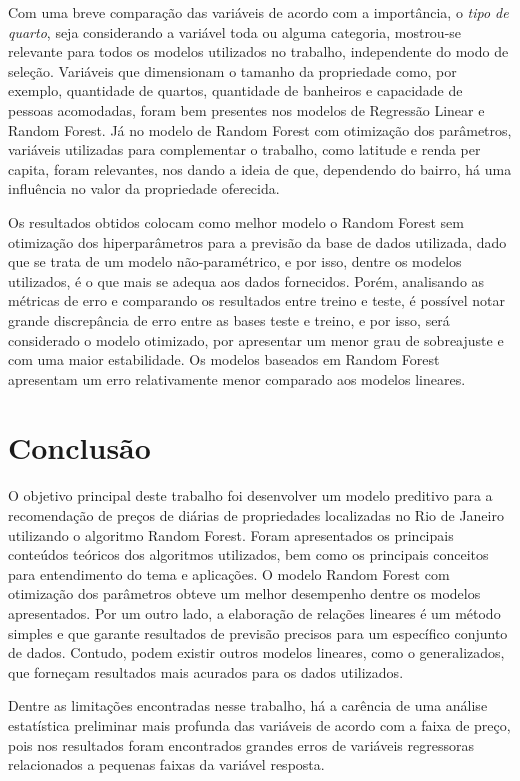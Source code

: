 \documentclass[
	12pt,				%
	a4paper,		%
	oneside,    %
	chapter=TITLE,		   %
	section=TITLE,		   %
	subsection=TITLE,	   %
	subsubsection=TITLE, %
	english,			%
	french,				%
	spanish,			%
	brazil,				%
]{abntex2}
\begin{document}
Com uma breve comparação das variáveis de acordo com a importância, o
\emph{tipo de quarto}, seja considerando a variável toda ou alguma
categoria, mostrou-se relevante para todos os modelos utilizados no
trabalho, independente do modo de seleção. Variáveis que dimensionam o
tamanho da propriedade como, por exemplo, quantidade de quartos,
quantidade de banheiros e capacidade de pessoas acomodadas, foram bem
presentes nos modelos de Regressão Linear e Random Forest. Já no modelo
de Random Forest com otimização dos parâmetros, variáveis utilizadas
para complementar o trabalho, como latitude e renda per capita, foram
relevantes, nos dando a ideia de que, dependendo do bairro, há uma
influência no valor da propriedade oferecida.

Os resultados obtidos colocam como melhor modelo o Random Forest sem
otimização dos hiperparâmetros para a previsão da base de dados
utilizada, dado que se trata de um modelo não-paramétrico, e por isso,
dentre os modelos utilizados, é o que mais se adequa aos dados
fornecidos. Porém, analisando as métricas de erro e comparando os
resultados entre treino e teste, é possível notar grande discrepância de
erro entre as bases teste e treino, e por isso, será considerado o
modelo otimizado, por apresentar um menor grau de sobreajuste e com uma
maior estabilidade. Os modelos baseados em Random Forest apresentam um
erro relativamente menor comparado aos modelos lineares.

\hypertarget{conclusuxe3o}{%
\chapter{Conclusão}\label{conclusuxe3o}}

O objetivo principal deste trabalho foi desenvolver um modelo preditivo
para a recomendação de preços de diárias de propriedades localizadas no
Rio de Janeiro utilizando o algoritmo Random Forest. Foram apresentados
os principais conteúdos teóricos dos algoritmos utilizados, bem como os
principais conceitos para entendimento do tema e aplicações. O modelo
Random Forest com otimização dos parâmetros obteve um melhor desempenho
dentre os modelos apresentados. Por um outro lado, a elaboração de
relações lineares é um método simples e que garante resultados de
previsão precisos para um específico conjunto de dados. Contudo, podem
existir outros modelos lineares, como o generalizados, que forneçam
resultados mais acurados para os dados utilizados.

Dentre as limitações encontradas nesse trabalho, há a carência de uma
análise estatística preliminar mais profunda das variáveis de acordo com
a faixa de preço, pois nos resultados foram encontrados grandes erros de
variáveis regressoras relacionados a pequenas faixas da variável
resposta.
\end{document}
